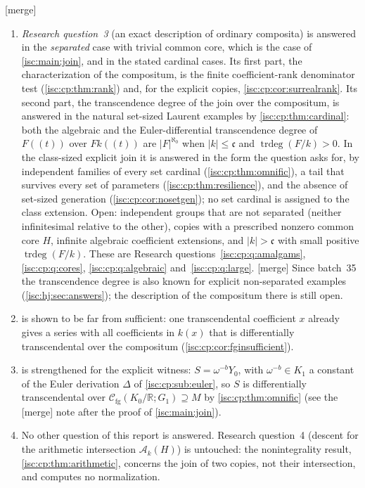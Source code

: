 \documentclass[11pt,letterpaper]{article}
\theoremstyle{definition}
\theoremstyle{remark}
\newcommand{\R}{\mathbb R}
\newcommand{\A}[2]{\mathcal A_{#1}(#2)}
\newcommand{\trdeg}{\operatorname{trdeg}}
\newcommand{\mtag}{\textup{[merge]}}%
\newcommand{\cc}{\mathfrak c}
\newcommand{\Cfg}{\mathcal C_{\mathrm{fg}}}
\numberwithin{equation}{section}
\begin{document}
\mtag{}
\begin{enumerate}[leftmargin=*,itemsep=3pt]
\item \emph{Research question~3} (an exact description of ordinary
composita) is answered in the \emph{separated} case with trivial common
core, which is the case of \cref{isc:main:join}, and in the stated cardinal
cases. Its first part, the characterization of the compositum, is the
finite coefficient-rank denominator test (\cref{isc:cp:thm:rank}) and, for
the explicit copies, \cref{isc:cp:cor:surrealrank}. Its second part, the
transcendence degree of the join over the compositum, is answered in the
natural set-sized Laurent examples by \cref{isc:cp:thm:cardinal}: both the
algebraic and the Euler-differential transcendence degree of $F((t))$ over
$F k((t))$ are $|F|^{\aleph_0}$ when $|k|\le\cc$ and $\trdeg(F/k)>0$. In
the class-sized explicit join it is answered in the form the question asks
for, by independent families of every set cardinal
(\cref{isc:cp:thm:omnific}), a tail that survives every set of parameters
(\cref{isc:cp:thm:resilience}), and the absence of set-sized generation
(\cref{isc:cp:cor:nosetgen}); no set cardinal is assigned to the class
extension. Open: independent groups that are not separated (neither
infinitesimal relative to the other), copies with a prescribed nonzero
common core $H$, infinite algebraic coefficient extensions, and $|k|>\cc$
with small positive $\trdeg(F/k)$. These are Research
questions~\ref{isc:cp:q:amalgams}, \ref{isc:cp:q:cores},
\ref{isc:cp:q:algebraic} and~\ref{isc:cp:q:large}. \mtag{} Since batch~35
the transcendence degree is also known for explicit non-separated examples
(\cref{isc:hj:sec:answers}); the description of the compositum there is
still open.
\item {} is shown to be far from sufficient: one
transcendental coefficient $x$ already gives a series with all coefficients
in $k(x)$ that is differentially transcendental over the compositum
(\cref{isc:cp:cor:fginsufficient}).
\item {} is strengthened for the explicit
witness: $S=\omega^{-b}Y_0$, with $\omega^{-b}\in K_1$ a constant of the
Euler derivation $\Delta$ of \cref{isc:cp:sub:euler}, so $S$ is
differentially transcendental over $\Cfg(K_0/\R;G_1)\supseteq M$ by
\cref{isc:cp:thm:omnific} (see the \mtag{} note after the proof of
\cref{isc:main:join}).
\item No other question of this report is answered. Research question~4
(descent for the arithmetic intersection $\A{k}{H}$) is untouched: the
nonintegrality result, \cref{isc:cp:thm:arithmetic}, concerns the join of two
copies, not their intersection, and computes no normalization.
\end{enumerate}
\end{document}
